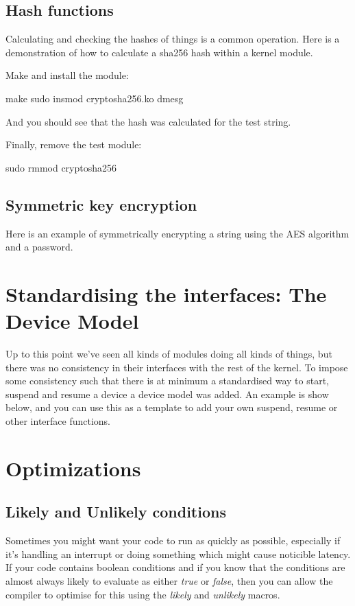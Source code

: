 \documentclass[10pt, oneside]{book}
\begin{document}
\subsection{Hash functions}
\label{sec:org4c7f10c}

Calculating and checking the hashes of things is a common operation. Here is a demonstration of how to calculate a sha256 hash within a kernel module.


Make and install the module:

\begin{codebash}
make
sudo insmod cryptosha256.ko
dmesg
\end{codebash}

And you should see that the hash was calculated for the test string.

Finally, remove the test module:

\begin{codebash}
sudo rmmod cryptosha256
\end{codebash}

\subsection{Symmetric key encryption}
\label{sec:org2fab20b}
Here is an example of symmetrically encrypting a string using the AES algorithm and a password.


\section{Standardising the interfaces: The Device Model}
\label{sec:org5e14930}
Up to this point we've seen all kinds of modules doing all kinds of things, but there was no consistency in their interfaces with the rest of the kernel. To impose some consistency such that there is at minimum a standardised way to start, suspend and resume a device a device model was added. An example is show below, and you can use this as a template to add your own suspend, resume or other interface functions.


\section{Optimizations}
\label{sec:org906f9cc}
\subsection{Likely and Unlikely conditions}
\label{sec:org63658ee}
Sometimes you might want your code to run as quickly as possible, especially if it's handling an interrupt or doing something which might cause noticible latency. If your code contains boolean conditions and if you know that the conditions are almost always likely to evaluate as either \emph{true} or \emph{false}, then you can allow the compiler to optimise for this using the \emph{likely} and \emph{unlikely} macros.
\end{document}
